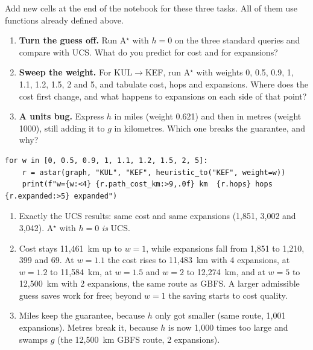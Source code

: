 \begin{yourturn}
Add new cells at the end of the notebook for these three tasks. All of them use functions already defined above.
\begin{enumerate}
  \item \textbf{Turn the guess off.} Run A$^\star$ with $h=0$ on the three standard queries and compare with UCS. What do you predict for cost and for expansions?
  \item \textbf{Sweep the weight.} For KUL$\to$KEF, run A$^\star$ with weights 0, 0.5, 0.9, 1, 1.1, 1.2, 1.5, 2 and 5, and tabulate cost, hops and expansions. Where does the cost first change, and what happens to expansions on each side of that point?
  \item \textbf{A units bug.} Express $h$ in miles (weight 0.621) and then in metres (weight 1000), still adding it to $g$ in kilometres. Which one breaks the guarantee, and why?
\end{enumerate}
\begin{lstlisting}[style=utppython]
for w in [0, 0.5, 0.9, 1, 1.1, 1.2, 1.5, 2, 5]:
    r = astar(graph, "KUL", "KEF", heuristic_to("KEF", weight=w))
    print(f"w={w:<4} {r.path_cost_km:>9,.0f} km  {r.hops} hops  {r.expanded:>5} expanded")
\end{lstlisting}
\end{yourturn}

\begin{expectedfindings}
\begin{enumerate}
  \item Exactly the UCS results: same cost and same expansions (1,851, 3,002 and 3,042). A$^\star$ with $h=0$ \emph{is} UCS.
  \item Cost stays 11,461~km up to $w=1$, while expansions fall from 1,851 to 1,210, 399 and 69. At $w=1.1$ the cost rises to 11,483~km with 4 expansions, at $w=1.2$ to 11,584~km, at $w=1.5$ and $w=2$ to 12,274~km, and at $w=5$ to 12,500~km with 2 expansions, the same route as GBFS. A larger admissible guess saves work for free; beyond $w=1$ the saving starts to cost quality.
  \item Miles keep the guarantee, because $h$ only got smaller (same route, 1,001 expansions). Metres break it, because $h$ is now 1,000 times too large and swamps $g$ (the 12,500~km GBFS route, 2 expansions).
\end{enumerate}
\end{expectedfindings}

